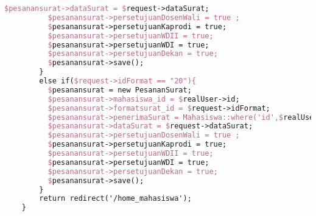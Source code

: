 \begin{lstlisting}[language=tex,basicstyle=\tiny,caption=PesanansuratController.php]
          $pesanansurat->dataSurat = $request->dataSurat;
          $pesanansurat->persetujuanDosenWali = true ;
          $pesanansurat->persetujuanKaprodi = true;
          $pesanansurat->persetujuanWDII = true;
          $pesanansurat->persetujuanWDI = true;
          $pesanansurat->persetujuanDekan = true;
          $pesanansurat->save();
        }
        else if($request->idFormat == "20"){
          $pesanansurat = new PesananSurat;
          $pesanansurat->mahasiswa_id = $realUser->id;
          $pesanansurat->formatsurat_id = $request->idFormat;
          $pesanansurat->penerimaSurat = Mahasiswa::where('id',$realUser->id)->first()->dosen->nama_dosen;
          $pesanansurat->dataSurat = $request->dataSurat;
          $pesanansurat->persetujuanDosenWali = true ;
          $pesanansurat->persetujuanKaprodi = true;
          $pesanansurat->persetujuanWDII = true;
          $pesanansurat->persetujuanWDI = true;
          $pesanansurat->persetujuanDekan = true;
          $pesanansurat->save();
        }
        return redirect('/home_mahasiswa');
    }


\end{lstlisting}

